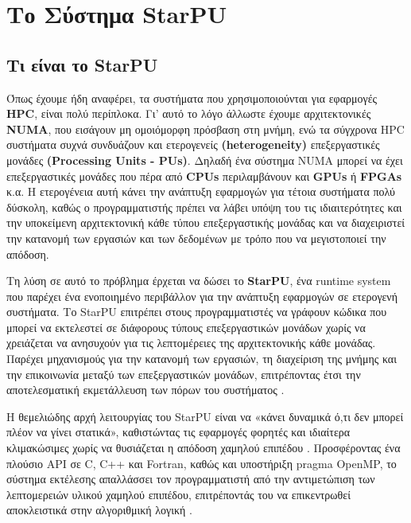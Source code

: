 
\chapter{Το Σύστημα StarPU} 

\section{Τι είναι το StarPU}

Όπως έχουμε ήδη αναφέρει, τα συστήματα που χρησιμοποιούνται για εφαρμογές \textbf{HPC}, είναι πολύ περίπλοκα. Γι' αυτό το λόγο άλλωστε έχουμε αρχιτεκτονικές \textbf{NUMA}, που εισάγουν μη ομοιόμορφη πρόσβαση στη μνήμη, ενώ τα σύγχρονα HPC συστήματα συχνά συνδυάζουν και ετερογενείς \textbf{(heterogeneity)} επεξεργαστικές μονάδες \textbf{(Processing Units - PUs)}. Δηλαδή ένα σύστημα NUMA μπορεί να έχει επεξεργαστικές μονάδες που πέρα από \textbf{CPUs} περιλαμβάνουν και \textbf{GPUs} ή \textbf{FPGAs} κ.α. Η ετερογένεια αυτή κάνει την ανάπτυξη εφαρμογών για τέτοια συστήματα πολύ δύσκολη, καθώς ο προγραμματιστής πρέπει να λάβει υπόψη του τις ιδιαιτερότητες και την υποκείμενη αρχιτεκτονική κάθε τύπου επεξεργαστικής μονάδας και να διαχειριστεί την κατανομή των εργασιών και των δεδομένων με τρόπο που να μεγιστοποιεί την απόδοση.

Τη λύση σε αυτό το πρόβλημα έρχεται να δώσει το \textbf{StarPU}, ένα runtime system που παρέχει ένα ενοποιημένο περιβάλλον για την ανάπτυξη εφαρμογών σε ετερογενή συστήματα. Το StarPU επιτρέπει στους προγραμματιστές να γράφουν κώδικα που μπορεί να εκτελεστεί σε διάφορους τύπους επεξεργαστικών μονάδων χωρίς να χρειάζεται να ανησυχούν για τις λεπτομέρειες της αρχιτεκτονικής κάθε μονάδας. Παρέχει μηχανισμούς για την κατανομή των εργασιών, τη διαχείριση της μνήμης και την επικοινωνία μεταξύ των επεξεργαστικών μονάδων, επιτρέποντας έτσι την αποτελεσματική εκμετάλλευση των πόρων του συστήματος \cite{augonnet2009starpu, starpu2025handbook}.

Η θεμελιώδης αρχή λειτουργίας του StarPU είναι να «κάνει δυναμικά ό,τι δεν μπορεί πλέον να γίνει στατικά», καθιστώντας τις εφαρμογές φορητές και ιδιαίτερα κλιμακώσιμες χωρίς να θυσιάζεται η απόδοση χαμηλού επιπέδου \cite{augonnet2010starpu_gtc}. Προσφέροντας ένα πλούσιο API σε C, C++ και Fortran, καθώς και υποστήριξη pragma OpenMP, το σύστημα εκτέλεσης απαλλάσσει τον προγραμματιστή από την αντιμετώπιση των λεπτομερειών υλικού χαμηλού επιπέδου, επιτρέποντάς του να επικεντρωθεί αποκλειστικά στην αλγοριθμική λογική \cite{starpu2025handbook}.

